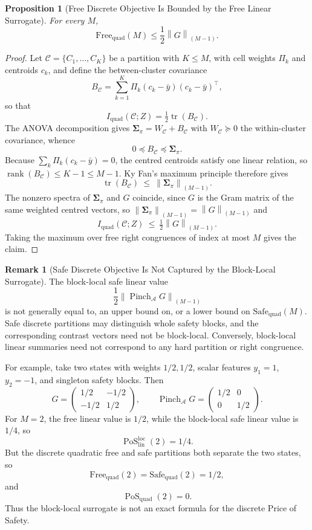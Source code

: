 \documentclass[12pt]{article}
\newtheorem{proposition}[theorem]{Proposition}
\theoremstyle{definition}
\newtheorem{remark}[theorem]{Remark}
\DeclareMathOperator{\rank}{rank}
\DeclareMathOperator{\tr}{tr}
\DeclareMathOperator{\PoS}{PoS}
\newcommand{\EA}{\operatorname{Pinch}_{\mathcal A}}
\newcommand{\KyF}[2]{\left\|#1\right\|_{(#2)}}
\newcommand{\PoSlin}{\PoS_{\mathrm{lin}}^{\mathrm{loc}}}
\newcommand{\PoSquad}{\PoS_{\mathrm{quad}}}
\begin{document}
\begin{proposition}[Free Discrete Objective Is Bounded by the Free Linear Surrogate]
\label{prop:free-discrete-bound}
For every $M$,
\[
\mathrm{Free}_{\mathrm{quad}}(M)
\le
\frac12
\KyF{G}{M-1}.
\]
\end{proposition}

\begin{proof}
Let $\mathcal C=\{C_1,\dots,C_K\}$ be a partition with $K\le M$, with cell
weights $\Pi_k$ and centroids $c_k$, and define the between-cluster covariance
\[
B_{\mathcal C}
=
\sum_{k=1}^K\Pi_k(c_k-\bar y)(c_k-\bar y)^\top ,
\]
so that
\[
I_{\mathrm{quad}}(\mathcal C;Z)=\tfrac12\tr(B_{\mathcal C}).
\]
The ANOVA decomposition gives $\bm{\Sigma}_\pi=W_{\mathcal C}+B_{\mathcal C}$ with
$W_{\mathcal C}\succeq0$ the within-cluster covariance, whence
\[
0\preceq B_{\mathcal C}\preceq\bm{\Sigma}_\pi .
\]
Because $\sum_k\Pi_k(c_k-\bar y)=0$, the centred centroids satisfy one linear
relation, so $\rank(B_{\mathcal C})\le K-1\le M-1$.  Ky Fan's maximum
principle \cite{kyfan1951} therefore gives
\[
\tr(B_{\mathcal C})\ \le\ \KyF{\bm{\Sigma}_\pi}{M-1}.
\]
The nonzero spectra of $\bm{\Sigma}_\pi$ and $G$ coincide, since $G$ is the Gram
matrix of the same weighted centred vectors, so
$\KyF{\bm{\Sigma}_\pi}{M-1}=\KyF{G}{M-1}$ and
\[
I_{\mathrm{quad}}(\mathcal C;Z)\ \le\ \tfrac12\KyF{G}{M-1}.
\]
Taking the maximum over free right congruences of index at most $M$ gives the
claim.
\end{proof}

\begin{remark}[Safe Discrete Objective Is Not Captured by the Block-Local Surrogate]
\label{rem:safe-discrete-not-captured}
The block-local safe linear value
\[
\frac12
\KyF{\EA G}{M-1}
\]
is not generally equal to, an upper bound on, or a lower bound on
$\mathrm{Safe}_{\mathrm{quad}}(M)$.  Safe discrete partitions may distinguish
whole safety blocks, and the corresponding contrast vectors need not be
block-local.  Conversely, block-local linear summaries need not correspond to
any hard partition or right congruence.

For example, take two states with weights $1/2,1/2$, scalar features
$y_1=1$, $y_2=-1$, and singleton safety blocks.  Then
\[
G=
\begin{pmatrix}
1/2 & -1/2\\
-1/2 & 1/2
\end{pmatrix},
\qquad
\EA G=
\begin{pmatrix}
1/2 & 0\\
0 & 1/2
\end{pmatrix}.
\]
For $M=2$, the free linear value is $1/2$, while the block-local safe linear
value is $1/4$, so
\[
\PoSlin(2)=1/4.
\]
But the discrete quadratic free and safe partitions both separate the two
states, so
\[
\mathrm{Free}_{\mathrm{quad}}(2)
=
\mathrm{Safe}_{\mathrm{quad}}(2)
=
1/2,
\]
and
\[
\PoSquad(2)=0.
\]
Thus the block-local surrogate is not an exact formula for the discrete Price
of Safety.
\end{remark}
\end{document}
